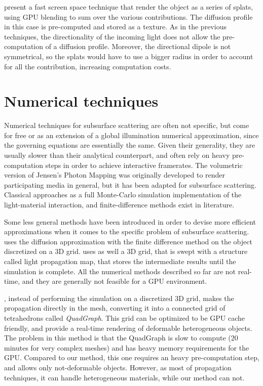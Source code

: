 \cite{4736459} present a fast screen space technique that render the object as a series of splats, using GPU blending to sum over the various contributions. The diffusion profile in this case is pre-computed and stored as a texture. As in the previous techniques, the directionality of the incoming light does not allow the pre-computation of a diffusion profile. Moreover, the directional dipole is not symmetrical, so the splats would have to use a bigger radius in order to account for all the contribution, increasing computation costs.

\section{Numerical techniques}

Numerical techniques for subsurface scattering are often not specific, but come for free or as an extension of a global illumination numerical approximation, since the governing equations are essentially the same. Given their generality, they are usually slower than their analytical counterpart, and often rely on heavy pre-computation steps in order to achieve interactive framerates. The volumetric version of Jensen's Photon Mapping\citep{Jensen:1998:ESL:280814.280925} was originally developed to render participating media in general, but it has been adapted for subsurface scattering\citep{Dorsey:1999:MRW:311535.311560}. Classical approaches as a full Monte-Carlo simulation implementation of the light-material interaction, and finite-difference methods exist in literature\citep{raey}. 

Some less general methods have been introduced in order to devise more efficient approximations when it comes to the specific problem of subsurface scattering. \cite{raey} uses the diffusion approximation with the finite difference method on the object discretized on a 3D grid. \cite{Fattal:2009:PMI:1477926.1477933} uses as well a 3D grid, that is swept with a structure called light propagation map, that stores the intermediate results until the simulation is complete. All the numerical methods described so far are not real-time, and they are generally not feasible for a GPU environment. 

\cite{journals/cgf/WangWHSYG10}, instead of performing the simulation on a discretized 3D grid, makes the propagation directly in the mesh, converting it into a connected grid of tetrahedrons called \emph{QuadGraph}. This grid can be optimized to be GPU cache friendly, and provide a real-time rendering of deformable heterogeneous objects. The problem in this method is that the QuadGraph is slow to compute (20 minutes for very complex meshes) and has heavy memory requirements for the GPU. Compared to our method, this one requires an heavy pre-computation step, and allows only not-deformable objects. However, as most of propagation techniques, it can handle heterogeneous materials, while our method can not.

